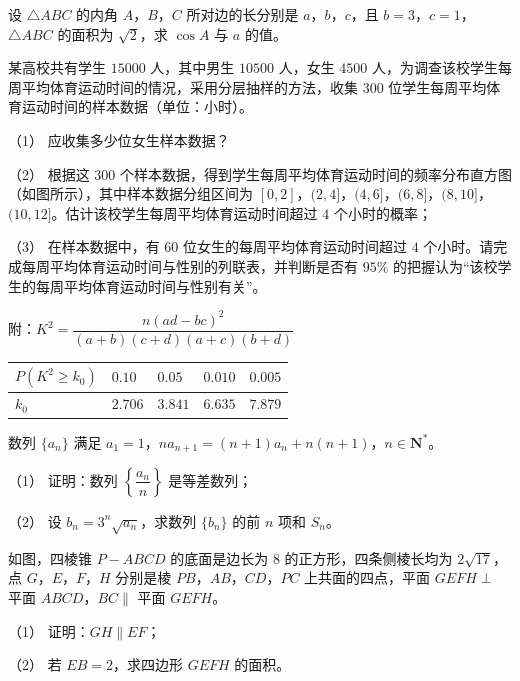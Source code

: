 \begin{question}
设 $\triangle ABC$ 的内角 $A$，$B$，$C$ 所对边的长分别是 $a$，$b$，$c$，且 $b=3$，$c=1$，$\triangle ABC$ 的面积为 $\sqrt2$，求 $\cos A$ 与 $a$ 的值。

\Needspace{0.4\textheight}
\end{question}
\begin{question}
某高校共有学生 $15000$ 人，其中男生 $10500$ 人，女生 $4500$ 人，为调查该校学生每周平均体育运动时间的情况，采用分层抽样的方法，收集 $300$ 位学生每周平均体育运动时间的样本数据（单位：小时）。
\nopagebreak[4]
\begin{center}\end{center}
\nopagebreak[4]
（1） 应收集多少位女生样本数据？

（2） 根据这 $300$ 个样本数据，得到学生每周平均体育运动时间的频率分布直方图（如图所示），其中样本数据分组区间为 $[0,2]$，$(2,4]$，$(4,6]$，$(6,8]$，$(8,10]$，$(10,12]$。估计该校学生每周平均体育运动时间超过 $4$ 个小时的概率；

（3） 在样本数据中，有 $60$ 位女生的每周平均体育运动时间超过 $4$ 个小时。请完成每周平均体育运动时间与性别的列联表，并判断是否有 $95\%$ 的把握认为“该校学生的每周平均体育运动时间与性别有关”。

附：$K^2=\dfrac{n(ad-bc)^2}{(a+b)(c+d)(a+c)(b+d)}$

\begin{center}
\begin{tabular}{lllll}
\toprule
$P(K^2\geqslant k_0)$ & $0.10$ & $0.05$ & $0.010$ & $0.005$ \\
\midrule
$k_0$ & $2.706$ & $3.841$ & $6.635$ & $7.879$ \\
\bottomrule
\end{tabular}
\end{center}

\end{question}
\begin{question}
数列 $\{a_n\}$ 满足 $a_1=1$，$na_{n+1}=(n+1)a_n+n(n+1)$，$n\in\mathbf N^*$。

（1） 证明：数列 $\left\{\dfrac{a_n}n\right\}$ 是等差数列；

（2） 设 $b_n=3^n\sqrt{a_n}$，求数列 $\{b_n\}$ 的前 $n$ 项和 $S_n$。

\Needspace{0.4\textheight}
\end{question}
\begin{question}
如图，四棱锥 $P-ABCD$ 的底面是边长为 $8$ 的正方形，四条侧棱长均为 $2\sqrt{17}$，点 $G$，$E$，$F$，$H$ 分别是棱 $PB$，$AB$，$CD$，$PC$ 上共面的四点，平面 $GEFH\perp$ 平面 $ABCD$，$BC\parallel$ 平面 $GEFH$。
\nopagebreak[4]
\begin{center}\end{center}
\nopagebreak[4]
（1） 证明：$GH\parallel EF$；

（2） 若 $EB=2$，求四边形 $GEFH$ 的面积。

\end{question}

